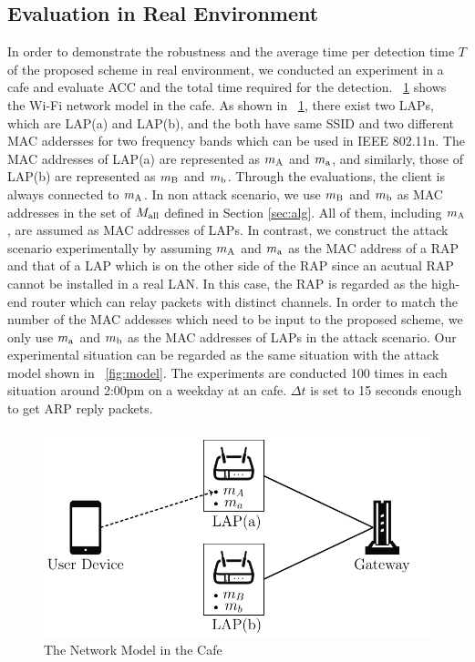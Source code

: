 \documentclass[paper]{ieice}
\newcommand{\stba}{m_{\rm a}}
\newcommand{\stbA}{m_{\rm A}}
\newcommand{\stbb}{m_{\rm b}}
\newcommand{\stbB}{m_{\rm B}}
\begin{document}
\subsection{Evaluation in Real Environment}
In order to demonstrate the robustness and the average time per detection time $T$ of the proposed scheme in real environment, we conducted an experiment in a cafe and evaluate ACC and the total time required for the detection.
\figurename~\ref{fig:sbx} shows the Wi-Fi network model in the cafe.
As shown in \figurename~\ref{fig:sbx}, there exist two LAPs, which are LAP(a) and LAP(b), and the both have same SSID and two different MAC addersses for two frequency bands which can be used in IEEE 802.11n.
The MAC addresses of LAP(a) are represented as $\stbA$ and $\stba$, and similarly, those of LAP(b) are represented as $\stbB$ and $\stbb$.
Through the evaluations, the client is always connected to $\stbA$.
In non attack scenario, we use $\stbB$ and $\stbb$ as MAC addresses in the set of $M_{\rm all}$ defined in Section \ref{sec:alg}.
All of them, including $\stbA$, are assumed as MAC addresses of LAPs.
In contrast, we construct the attack scenario experimentally by assuming $\stbA$ and $\stba$ as the MAC address of a RAP and that of a LAP which is on the other side of the RAP since an acutual RAP cannot be installed in a real LAN.
In this case, the RAP is regarded as the high-end router which can relay packets with distinct channels.
In order to match the number of the MAC addesses which need to be input to the proposed scheme, we only use $\stba$ and $\stbb$ as the MAC addresses of LAPs in the attack scenario.
Our experimental situation can be regarded as the same situation with the attack model shown in \figurename~\ref{fig:model}.
The experiments are conducted 100 times in each situation around 2:00pm on a weekday at an cafe.
$\Delta t$ is set to 15 seconds enough to get ARP reply packets.
\begin{figure}[t]
    \begin{center}
        \includegraphics[scale=0.64]{starbucks/starbucks.pdf}
        \caption{The Network Model in the Cafe}
        \label{fig:sbx}
    \end{center}
    \vspace{-1zh}
\end{figure}
\end{document}
